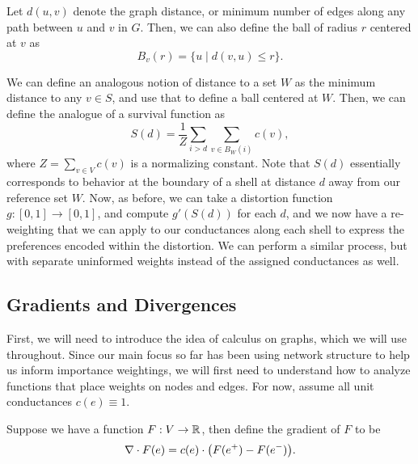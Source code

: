 \begin{definition}
    Let $d(u,v)$ denote the graph distance, or minimum number of edges along any path between $u$ and $v$ in $G$. Then, we can also define the ball of radius $r$ centered at $v$ as
    \begin{equation}
        B_v(r) = \{u \mid d(v,u) \le r\}.
    \end{equation}
\end{definition}

We can define an analogous notion of distance to a set $W$ as the minimum distance to any $v\in S$, and use that to define a ball centered at $W$. Then, we can define the analogue of a survival function as 
\begin{equation}
    S(d) = \frac1Z\sum_{i>d}\sum_{v\in B_W(i)} c(v),
\end{equation}
where $Z=\sum_{v\in V}c(v)$ is a normalizing constant. Note that $S(d)$ essentially corresponds to behavior at the boundary of a shell at distance $d$ away from our reference set $W$. Now, as before, we can take a distortion function $g:[0,1]\to[0,1]$, and compute $g'(S(d))$ for each $d$, and we now have a re-weighting that we can apply to our conductances along each shell to express the preferences encoded within the distortion. We can perform a similar process, but with separate uninformed weights instead of the assigned conductances as well.


\subsection{Gradients and Divergences}

First, we will need to introduce the idea of calculus on graphs, which we will use throughout. Since our main focus so far has been using network structure to help us inform importance weightings, we will first need to understand how to analyze functions that place weights on nodes and edges. For now, assume all unit conductances $c(e)\equiv 1$.

\begin{definition}
    Suppose we have a function $F:V\to \mathbb R$, then define the gradient of $F$ to be
    \begin{equation}
        \nabla\cdot F(e) = c(e)\cdot\pars*{F(e^+)-F(e^-)}.
    \end{equation}
\end{definition}

